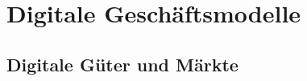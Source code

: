 \documentclass[12pt,a4paper]{article}
\begin{document}
\newpage
\section{Digitale Geschäftsmodelle}

\vspace*{0.5cm}
\subsection{Digitale Güter und Märkte} %
\end{document}

